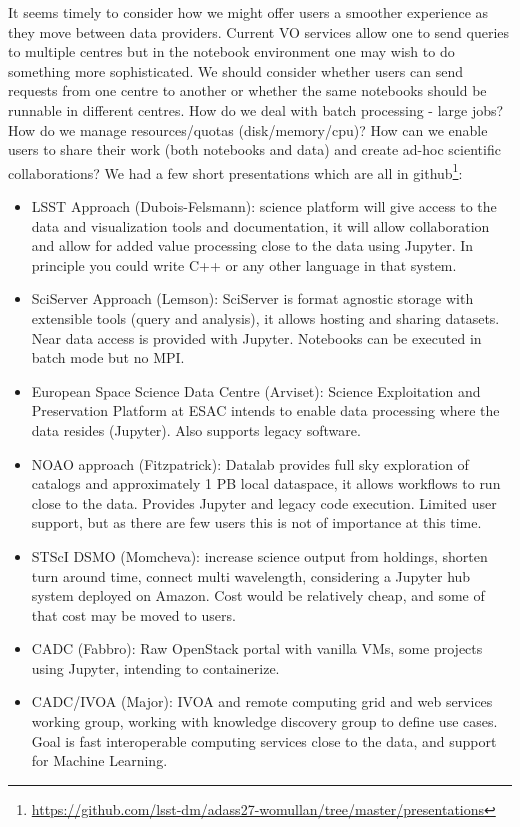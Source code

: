 \documentclass[11pt,twoside]{article}
\begin{document}
It seems timely to consider how we might offer users a smoother experience as they move between data providers.
Current VO services allow one to send queries to multiple centres but in the notebook environment one may wish to do something more sophisticated. We should consider whether users can send requests from one centre to another or whether the same notebooks should be runnable in different centres.
How do we deal with batch processing - large jobs? How do we manage resources/quotas (disk/memory/cpu)?  How can we enable users to share their work (both notebooks and data) and create ad-hoc scientific collaborations?
We had a few short presentations which are all in github\footnote{\url{https://github.com/lsst-dm/adass27-womullan/tree/master/presentations}}:
\begin{itemize}
\item LSST Approach (Dubois-Felsmann): science platform will give access to the data and visualization tools and documentation, it will allow collaboration and allow for added value processing close to the data using Jupyter. In principle you could write C++ or any other language in that system.

\item SciServer Approach (Lemson): SciServer is format agnostic storage with extensible tools (query and analysis), it allows hosting and sharing datasets. Near data access is provided with Jupyter. Notebooks can be executed in batch mode but no MPI.

\item European Space Science Data Centre (Arviset): Science Exploitation and Preservation Platform at ESAC
intends to enable data processing where the data resides (Jupyter). Also supports legacy software.

\item NOAO approach (Fitzpatrick): Datalab provides full sky exploration of catalogs and approximately 1 PB local dataspace, it allows workflows to run close to the data. Provides Jupyter and legacy code execution. Limited user support, but as there are few users this is not of importance at this time.
\item STScI DSMO (Momcheva): increase science output from holdings, shorten turn around time, connect multi wavelength, considering a Jupyter hub system deployed on Amazon. Cost would be relatively cheap, and some of that cost may be moved to users.

\item CADC (Fabbro): Raw OpenStack portal with vanilla VMs, some projects using Jupyter, intending to containerize.

\item CADC/IVOA (Major): IVOA and remote computing grid and web services working group, working with knowledge discovery group to define use cases.
Goal is fast interoperable computing services close to the data, and support for Machine Learning.
\end{itemize}
\end{document}
